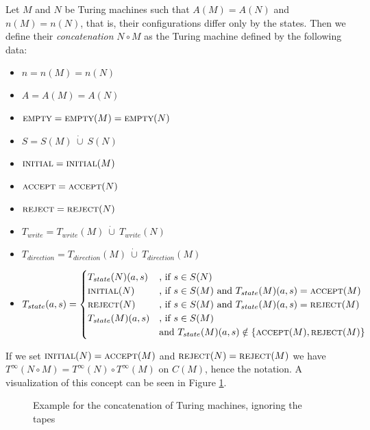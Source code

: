 \begin{Definition}
	Let $M$ and $N$ be Turing machines such that $A(M) = A(N)$ and $n(M) = n(N)$, that is, their configurations differ only by the states. Then we define their \emph{concatenation} $N \circ M$ as the Turing machine defined by the following data:
	\begin{itemize}
		\item{$n = n(M) = n(N)$}
		\item{$A = A(M) = A(N)$}
		\item{$\text{\scshape{empty}} = \text{\scshape{empty}}(M) = \text{\scshape{empty}}(N)$}
		\item{$S = S(M)~\dot\cup~S(N)$}
		\item{$\text{\scshape{initial}} = \text{\scshape{initial}}(M)$}
		\item{$\text{\scshape{accept}} = \text{\scshape{accept}}(N)$}
		\item{$\text{\scshape{reject}} = \text{\scshape{reject}}(N)$}
		\item{$T_{write} = T_{write}(M)~\dot\cup~T_{write}(N)$}
		\item{$T_{direction} = T_{direction}(M)~\dot\cup~T_{direction}(M)$}
		\item{$T_{state} (a,s) =
			\begin{cases}
				T_{state}(N) (a,s) &\text{, if}~s \in S(N) \\
				\text{\scshape{initial}}(N) &\text{, if}~s \in S(M)~\text{and}~T_{state}(M)(a,s) = \text{\scshape{accept}}(M) \\
				\text{\scshape{reject}}(N) &\text{, if}~s \in S(M)~\text{and}~T_{state}(M)(a,s) = \text{\scshape{reject}}(M) \\
				T_{state}(M) (a,s) &\text{, if}~s \in S(M) \\&\text{and}~T_{state}(M)(a,s) \notin \{\text{\scshape{accept}}(M),\text{\scshape{reject}}(M)\}
			\end{cases}
		$}
	\end{itemize}
\end{Definition}
\begin{Remark}
	If we set $\text{\scshape{initial}}(N) = \text{\scshape{accept}}(M)$ and $\text{\scshape{reject}}(N) = \text{\scshape{reject}}(M)$ we have $T^\infty(N \circ M) = T^\infty(N) \circ T^\infty(M)$ on $C(M)$, hence the notation. A visualization of this concept can be seen in Figure \ref{turing_machines:basic_notions:fig_concatenation}.
\end{Remark}
\begin{figure}[h]
	\centering
	
	\caption{Example for the concatenation of Turing machines, ignoring the tapes}
	\label{turing_machines:basic_notions:fig_concatenation}
\end{figure}
